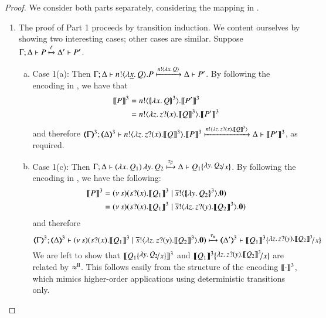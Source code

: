 \begin{proof}
We consider both parts separately,
considering the mapping in .

\begin{enumerate}
	\item The proof of Part 1 proceeds by transition induction. We 
		content ourselves by showing two interesting cases; other cases are similar.  
		Suppose $\Gamma; \Delta \vdash P \xmapsto{\ell} \Delta' \vdash P'$.

	\begin{enumerate}[a)]
	
			\item	%
			Case 1(a): 
			Then 
			$\Gamma; \Delta \vdash n ! \langle \lambda \underline{x}.\,Q \rangle . P \xmapsto{ n !\langle \lambda x.\,Q \rangle} \Delta \vdash P'$.
By following the encoding in , we have 
that 
\begin{align*}
\llbracket P\rrbracket^3 & = n ! \langle \{\!|\lambda x.\,Q|\!\}^3 \rangle . \llbracket P'\rrbracket^3 \\
& = n ! \langle \lambda z.\,z ? (x) . \llbracket Q\rrbracket^3 \rangle . \llbracket P'\rrbracket^3
\end{align*}
and therefore
 			$\horel{\tmap{\Gamma}{3}}{\tmap{\Delta}{3}}{\bout{n}{\abs{z} \binp{z}{x} \pmap{Q}{3}} \pmap{P}{3}}{\hby{ \bactout{n}{\abs{z}{\binp{z}{x} \pmap{Q}{3}} } }}{\Delta}{\pmap{P'}{3}}$,
			as required.

		\item	%
		Case 1(c): Then 
$\horel{\Gamma}{\Delta}{\appl{(\abs{x}{Q_1})}{\abs{y}{Q_2}}}{\hby{\btau}}{\Delta}{Q_1 \subst{\abs{y}{Q_2}}{x}}$.
By following the encoding in , we have the following: 
\begin{align*}
\llbracket P\rrbracket^3 & = (\nu\, s)(s ? (x) . \llbracket Q_1\rrbracket^3 \;|\; \overline{s} ! \langle \{\!|\lambda y.\,Q_2|\!\}^3 \rangle .\mathbf{0}) \\
& = (\nu\, s)(s ? (x) . \llbracket Q_1\rrbracket^3 \;|\; \overline{s} ! \langle \lambda z.\,z ? (y) .\llbracket Q_2\rrbracket^3 \rangle .\mathbf{0}) 
\end{align*}
and therefore
\[
			\horel{\tmap{\Gamma}{3}}{\tmap{\Delta}{3}}{\newsp{s}{\binp{s}{x} \pmap{Q_1}{3} \Par \bout{\dual{s}}{\abs{z}{\binp{z}{y}\pmap{Q_2}{3}}} \inact}}{\hby{\stau}}
			{\tmap{\Delta'}{3}}{\pmap{Q_1}{3} \subst{\abs{z}{\binp{z}{y}\pmap{Q_2}{3}}}{x}}
\]
We are left to show that $\pmap{Q_1 \subst{\abs{y}{Q_2}}{x}}{3}$ 
and $\pmap{Q_1}{3} \subst{\abs{z}{\binp{z}{y}\pmap{Q_2}{3}}}{x}$ are related by $\approx^\mathtt{H}$.
This follows easily from the structure of the encoding $\llbracket\cdot\rrbracket^3$, 
which mimics higher-order applications using deterministic transitions only.



\end{enumerate}
\end{enumerate}
\end{proof}
